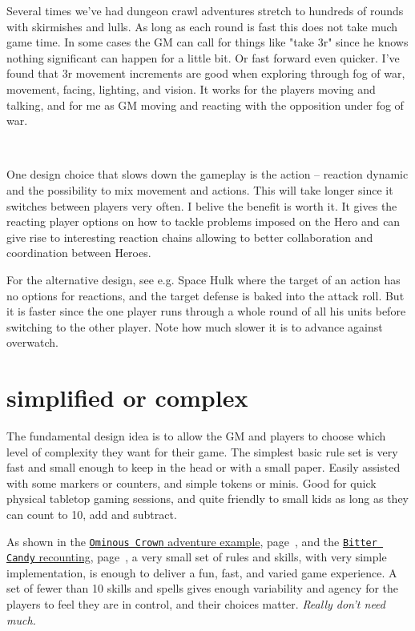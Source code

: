 Several times we've had dungeon crawl adventures stretch to hundreds of rounds with skirmishes and lulls. As long as each round is fast this does not take much game time. In some cases the GM can call for things like "take 3r" since he knows nothing significant can happen for a little bit. Or fast forward even quicker. I've found that 3r movement increments are good when exploring through fog of war, movement, facing, lighting, and vision. It works for the players moving and talking, and for me as GM moving and reacting with the opposition under fog of war.

\

One design choice that slows down the gameplay is the action -- reaction dynamic and the possibility to mix movement and actions. This will take longer since it switches between players very often. I belive the benefit is worth it. It gives the reacting player options on how to tackle problems imposed on the Hero and can give rise to interesting reaction chains allowing to better collaboration and coordination between Heroes.

For the alternative design, see e.g. Space Hulk where the target of an action has no options for reactions, and the target defense is baked into the attack roll. But it is faster since the one player runs through a whole round of all his units before switching to the other player. Note how much slower it is to advance against overwatch.


\section*{simplified or complex}
The fundamental design idea is to allow the GM and players to choose which level of complexity they want for their game. The simplest basic rule set is very fast and small enough to keep in the head or with a small paper. Easily assisted with some markers or counters, and simple tokens or minis. Good for quick physical tabletop gaming sessions, and quite friendly to small kids as long as they can count to 10, add and subtract.

As shown in the
\hyperref[sec:basicenough]{\texttt{Ominous Crown} adventure example}, page~\pageref{sec:basicenough}, and the
\hyperref[sec:youngkids]{\texttt{Bitter Candy} recounting}, page~\pageref{sec:youngkids},
a very small set of rules and skills, with very simple implementation, is enough to deliver a fun, fast, and varied game experience. A set of fewer than 10 skills and spells gives enough variability and agency for the players to feel they are in control, and their choices matter. \emph{Really don't need much.}


